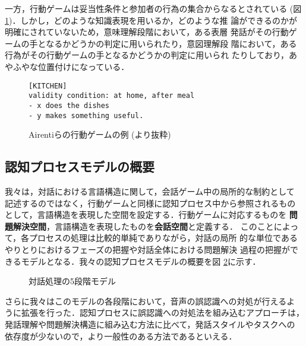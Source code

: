 一方，行動ゲームは妥当性条件と参加者の行為の集合からなるとされている
(図\ref{airenti2})．しかし，どのような知識表現を用いるか，どのような推
論ができるのかが明確にされていないため，意味理解段階において，ある表層
発話がその行動ゲームの手となるかどうかの判定に用いられたり，意図理解段
階において，ある行為がその行動ゲームの手となるかどうかの判定に用いられ
たりしており，あやふやな位置付けになっている．

\begin{figure}[htbp]
\begin{center}
\begin{minipage}{10cm}
\begin{verbatim}
[KITCHEN]
validity condition: at home, after meal
- x does the dishes
- y makes something useful.
\end{verbatim}
\end{minipage}
\end{center}
\caption{Airentiらの行動ゲームの例 (\cite{airenti93}より抜粋)}
\label{airenti2}
\end{figure}

\subsection{認知プロセスモデルの概要}

我々は，対話における言語構造に関して，会話ゲーム中の局所的な制約として
記述するのではなく，行動ゲームと同様に認知プロセス中から参照されるもの
として，言語構造を表現した空間を設定する．行動ゲームに対応するものを
{\bf 問題解決空間}，言語構造を表現したものを{\bf 会話空間}と定義する．
このことによって，各プロセスの処理は比較的単純でありながら，対話の局所
的な単位であるやりとりにおけるフェーズの把握や対話全体における問題解決
過程の把握ができるモデルとなる．我々の認知プロセスモデルの概要を図
\ref{model}に示す．

\begin{figure}[htbp]
\vspace{-5mm}
\begin{center}
\end{center}
\caption{対話処理の5段階モデル}
\label{model}
\end{figure}

さらに我々はこのモデルの各段階において，音声の誤認識への対処が行えるよ
うに拡張を行った．認知プロセスに誤認識への対処法を組み込むアプローチは，
発話理解や問題解決構造に組み込む方法に比べて，発話スタイルやタスクへの
依存度が少ないので，より一般性のある方法であるといえる．

